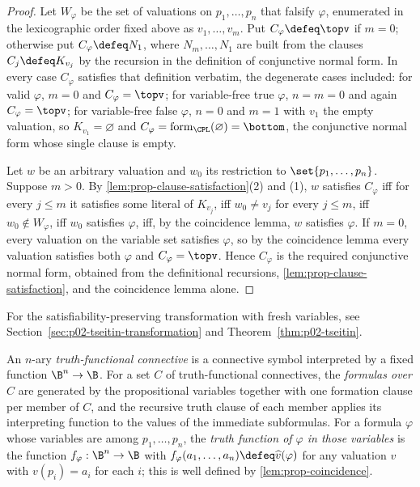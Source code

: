 \begin{proof}
Let \(W_\varphi\) be the set of valuations on \(p_1,\ldots,p_n\) that
falsify \(\varphi\), enumerated in the lexicographic order fixed above as
\(v_1,\ldots,v_m\).  Put \(C_\varphi\defeq\topv\) if \(m=0\); otherwise
put \(C_\varphi\defeq N_1\), where \(N_m,\ldots,N_1\) are built from the
clauses \(C_j\defeq K_{v_j}\) by the recursion in the definition of
conjunctive normal form.  In every case \(C_\varphi\) satisfies that
definition verbatim, the degenerate cases included: for valid
\(\varphi\), \(m=0\) and \(C_\varphi=\topv\); for variable-free true
\(\varphi\), \(n=m=0\) and again \(C_\varphi=\topv\); for variable-free
false \(\varphi\), \(n=0\) and \(m=1\) with \(v_1\) the empty valuation,
so \(K_{v_1}=\varnothing\) and
\(C_\varphi=\operatorname{form}_{\CPL}(\varnothing)=\bottom\), the
conjunctive normal form whose single clause is empty.

Let \(w\) be an arbitrary valuation and \(w_0\) its restriction to
\(\set{p_1,\ldots,p_n}\).  Suppose \(m>0\).  By
\cref{lem:prop-clause-satisfaction}(2) and (1), \(w\) satisfies
\(C_\varphi\) iff for every \(j\leq m\) it satisfies some literal of
\(K_{v_j}\), iff \(w_0\ne v_j\) for every \(j\leq m\), iff
\(w_0\notin W_\varphi\), iff \(w_0\) satisfies \(\varphi\), iff, by the
coincidence lemma, \(w\) satisfies \(\varphi\).  If \(m=0\), every
valuation on the variable set satisfies \(\varphi\), so by the
coincidence lemma every valuation satisfies both \(\varphi\) and
\(C_\varphi=\topv\).  Hence \(C_\varphi\) is the required conjunctive
normal form, obtained from the definitional recursions,
\cref{lem:prop-clause-satisfaction}, and the coincidence lemma alone.
\end{proof}

For the satisfiability-preserving transformation with fresh variables,
see Section~\ref{sec:p02-tseitin-transformation} and
Theorem~\ref{thm:p02-tseitin}.

An \(n\)-ary \emph{truth-functional connective} is a connective symbol
interpreted by a fixed function \(\B^n\to\B\).  For a set \(C\) of
truth-functional connectives, the \emph{formulas over \(C\)} are generated
by the propositional variables together with one formation clause per member
of \(C\), and the recursive truth clause of each member applies its
interpreting function to the values of the immediate subformulas.  For a
formula \(\varphi\) whose variables are among \(p_1,\ldots,p_n\), the
\emph{truth function of \(\varphi\) in those variables} is the function
\(f_\varphi:\B^n\to\B\) with
\(f_\varphi(a_1,\ldots,a_n)\defeq\widehat v(\varphi)\) for any valuation
\(v\) with \(v(p_i)=a_i\) for each \(i\); this is well defined by
\cref{lem:prop-coincidence}.

